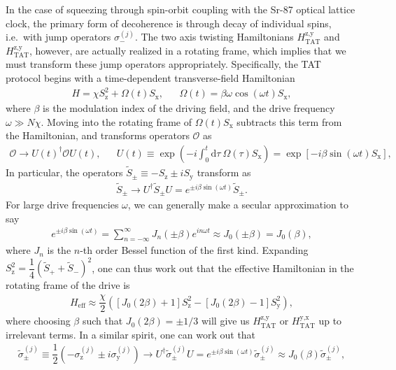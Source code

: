 \documentclass[aps,notitlepage,nofootinbib,11pt]{revtex4-1}
\renewcommand{\t}{\text} %
\newcommand{\f}[2]{\dfrac{#1}{#2}} %
\newcommand{\p}[1]{\left(#1\right)} %
\renewcommand{\sp}[1]{\left[#1\right]} %
\renewcommand{\d}{\text{d}} %
\renewcommand{\O}{\mathcal{O}}
\newcommand{\z}{\text{z}}
\newcommand{\x}{\text{x}}
\newcommand{\y}{\text{y}}
\newcommand{\1}{\mathds{1}}
\begin{document}
In the case of squeezing through spin-orbit coupling with the Sr-87
optical lattice clock, the primary form of decoherence is through
decay of individual spins, i.e.~with jump operators $\sigma_-^{(j)}$.
The two axis twisting Hamiltonians $H_{\t{TAT}}^{\z,\y}$ and
$H_{\t{TAT}}^{\z,\y}$, however, are actually realized in a rotating
frame, which implies that we must transform these jump operators
appropriately.  Specifically, the TAT protocol begins with a
time-dependent transverse-field Hamiltonian
\begin{align}
  H = \chi S_\z^2 + \Omega\p{t} S_\x,
  &&
  \Omega\p{t} = \beta\omega\cos\p{\omega t} S_\x,
\end{align}
where $\beta$ is the modulation index of the driving field, and the
drive frequency $\omega\gg N\chi$.  Moving into the rotating frame of
$\Omega\p{t}S_\x$ subtracts this term from the Hamiltonian, and
transforms operators $\O$ as
\begin{align}
  \O \to U\p{t}^\dag \O U\p{t},
  &&
  U\p{t} \equiv \exp\p{-i\int_0^t\d\tau~\Omega\p{\tau}S_\x}
  = \exp\sp{-i\beta\sin\p{\omega t}S_\x},
\end{align}
In particular, the operators $\tilde S_\pm\equiv-S_\z\pm iS_\y$
transform as
\begin{align}
  \tilde S_\pm
  \to U^\dag \tilde S_\pm U
  = e^{\pm i\beta\sin\p{\omega t}} \tilde S_\pm.
\end{align}
For large drive frequencies $\omega$, we can generally make a secular
approximation to say
\begin{align}
  e^{\pm i\beta\sin\p{\omega t}}
  = \sum_{n=-\infty}^\infty J_n\p{\pm\beta} e^{in\omega t}
  \approx J_0\p{\pm\beta} = J_0\p{\beta},
\end{align}
where $J_n$ is the $n$-th order Bessel function of the first kind.
Expanding $S_\z^2=\f14\p{\tilde S_++\tilde S_-}^2$, one can thus work
out that the effective Hamiltonian in the rotating frame of the drive
is
\begin{align}
  H_{\t{eff}}
  \approx \f{\chi}{2} \p{\sp{J_0\p{2\beta}+1} S_\z^2
  - \sp{J_0\p{2\beta}-1} S_\y^2},
\end{align}
where choosing $\beta$ such that $J_0\p{2\beta}=\pm1/3$ will give us
$H_{\t{TAT}}^{\z,\y}$ or $H_{\t{TAT}}^{\y,\x}$ up to irrelevant terms.
In a similar spirit, one can work out that
\begin{align}
  \tilde\sigma_\pm^{(j)}
  \equiv \f12\p{-\sigma_\z^{(j)}\pm i\sigma_\y^{(j)}}
  \to U^\dag \tilde\sigma_\pm^{(j)} U
  = e^{\pm i\beta\sin\p{\omega t}} \tilde\sigma_\pm^{(j)}
  \approx J_0\p{\beta} \tilde\sigma_\pm^{(j)},
\end{align}
\end{document}
